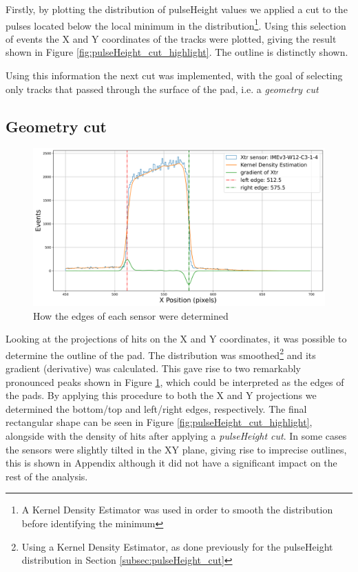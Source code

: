 Firstly, by plotting the distribution of pulseHeight values we applied a cut to the pulses located below the local minimum in the distribution\footnote{A Kernel Density Estimator was used in order to smooth the distribution before identifying the minimum}.
Using this selection of events the X and Y coordinates of the tracks were plotted, giving the result shown in Figure \ref{fig:pulseHeight_cut_highlight}.
The outline is distinctly shown.

Using this information the next cut was implemented, with the goal of selecting only tracks that passed through the surface of the pad, i.e. a \textit{geometry cut}

\subsection{Geometry cut}\label{sec:geometry_cut}

\begin{figure}[!ht]
    \centering
    \includegraphics[width=.7\linewidth]{Images/plots_of_cuts/locating_edges_Xtr_batch_401_S1_DUT3.png}
    \caption{How the edges of each sensor were determined}
    \label{fig:edges_of_the_sensor}
\end{figure}

Looking at the projections of hits on the X and Y coordinates, it was possible to determine the outline of the pad. The distribution was smoothed\footnote{Using a Kernel Density Estimator, as done previously for the pulseHeight distribution in Section \ref{subsec:pulseHeight_cut}} and its gradient (derivative) was calculated. This gave rise to two remarkably pronounced peaks shown in Figure \ref{fig:edges_of_the_sensor}, which could be interpreted as the edges of the pads. By applying this procedure to both the X and Y projections we determined the bottom/top and left/right edges, respectively. The final rectangular shape can be seen in Figure \ref{fig:pulseHeight_cut_highlight}, alongside with the density of hits after applying a \textit{pulseHeight cut}. In some cases the sensors were slightly tilted in the XY plane, giving rise to imprecise outlines, this is  shown in Appendix although it did not have a significant impact on the rest of the analysis.

